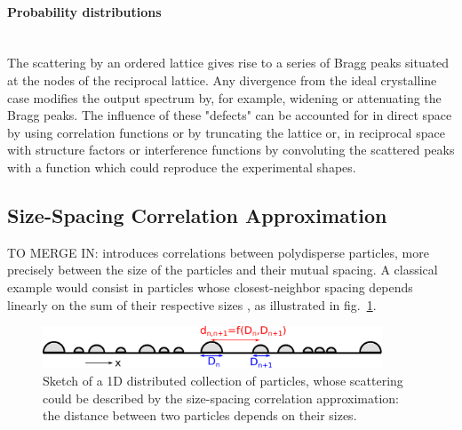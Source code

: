 \paragraph{Probability distributions} \mbox{}\\
The scattering by an ordered lattice gives rise to a series of Bragg peaks situated at the nodes of the reciprocal lattice. Any divergence from the ideal crystalline case modifies the output spectrum by, for example, widening or attenuating the Bragg peaks. The influence of these "defects" can be accounted for
 in direct space by using correlation functions or by truncating the lattice or, in reciprocal space with structure factors or interference functions by convoluting the scattered peaks with a function which could reproduce the experimental shapes.

\subsection{Size-Spacing Correlation Approximation}

TO MERGE IN:
introduces correlations between polydisperse particles, more precisely between the size of the particles and their mutual spacing. A classical example would consist in particles whose closest-neighbor spacing depends linearly on the sum of their respective sizes \cite{LaLR07}, as illustrated in fig.~\ref{fig:ssca}.


\begin{figure}[tb]
\begin{center}
\includegraphics[width=0.9\textwidth]{fig/drawing/drawingSSCA.pdf}
\end{center}
\caption{Sketch of a 1D distributed collection of particles, whose scattering could be described by the size-spacing correlation approximation: the distance between two particles depends on their sizes.}
\label{fig:ssca}
\end{figure}


